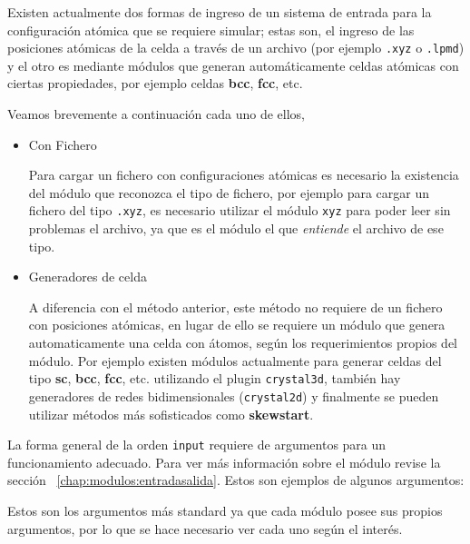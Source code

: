 Existen actualmente dos formas de ingreso de un sistema de entrada para la configuraci\'on at\'omica que se requiere simular; estas son, el ingreso de las posiciones at\'omicas de la celda a trav\'es de un archivo (por ejemplo \verb|.xyz| o \verb|.lpmd|) y el otro es mediante m\'odulos que generan autom\'aticamente celdas at\'omicas con ciertas propiedades, por ejemplo celdas \textbf{bcc}, \textbf{fcc}, etc.

Veamos brevemente a continuaci\'on cada uno de ellos,

\begin{itemize}
 \item{Con Fichero}

Para cargar un fichero con configuraciones at\'omicas es necesario la existencia del m\'odulo que reconozca el tipo de fichero, por ejemplo para cargar un fichero del tipo \verb|.xyz|, es necesario utilizar el m\'odulo \verb|xyz| para poder leer sin problemas el archivo, ya que es el m\'odulo el que \textit{entiende} el archivo de ese tipo. 
  \item{Generadores de celda}

A diferencia con el m\'etodo anterior, este m\'etodo no requiere de un fichero con posiciones at\'omicas, en lugar de ello se requiere un m\'odulo que genera automaticamente una celda con \'atomos, seg\'un los requerimientos propios del m\'odulo. Por ejemplo existen m\'odulos actualmente para generar celdas del tipo \textbf{sc}, \textbf{bcc}, \textbf{fcc}, etc. utilizando el plugin \verb|crystal3d|, tambi\'en hay generadores de redes bidimensionales (\verb|crystal2d|) y finalmente se pueden utilizar m\'etodos m\'as sofisticados como \textbf{skewstart}.

\end{itemize}

La forma general de la orden \verb|input| requiere de argumentos para un funcionamiento adecuado. Para ver m\'as informaci\'on sobre el m\'odulo revise la secci\'on ~\ref{chap:modulos:entradasalida}. Estos son ejemplos de algunos argumentos:


Estos son los argumentos m\'as standard ya que cada m\'odulo posee sus propios argumentos, por lo que se hace necesario ver cada uno seg\'un el inter\'es.

